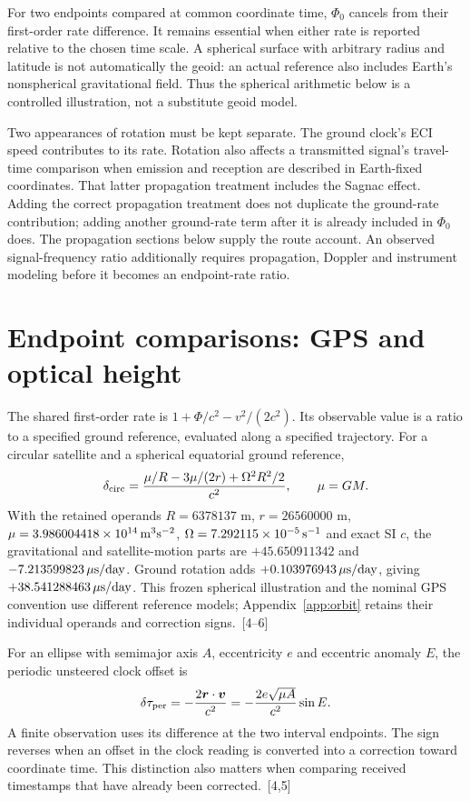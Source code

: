 \documentclass[10pt,twocolumn,letterpaper]{article}
\begin{document}
For two endpoints compared at common coordinate time, $\Phi_0$ cancels from their first-order rate difference. It remains essential when either rate is reported relative to the chosen time scale. A spherical surface with arbitrary radius and latitude is not automatically the geoid: an actual reference also includes Earth's nonspherical gravitational field. Thus the spherical arithmetic below is a controlled illustration, not a substitute geoid model.

Two appearances of rotation must be kept separate. The ground clock's ECI speed contributes to its rate. Rotation also affects a transmitted signal's travel-time comparison when emission and reception are described in Earth-fixed coordinates. That latter propagation treatment includes the Sagnac effect. Adding the correct propagation treatment does not duplicate the ground-rate contribution; adding another ground-rate term after it is already included in $\Phi_0$ does. The propagation sections below supply the route account. An observed signal-frequency ratio additionally requires propagation, Doppler and instrument modeling before it becomes an endpoint-rate ratio.


\section{Endpoint comparisons: GPS and optical height}
The shared first-order rate is $1+\Phi/c^2-v^2/(2c^2)$. Its observable value is a ratio to a specified ground reference, evaluated along a specified trajectory. For a circular satellite and a spherical equatorial ground reference,
\[
 \delta_{\rm circ}=\frac{\mu/R-3\mu/(2r)+\Omega^2R^2/2}{c^2},\qquad \mu=GM.
\]
With the retained operands $R=6378137$ m, $r=26560000$ m, $\mu=3.986004418\times 10^{14}\,{\rm m^3s^{-2}}$, $\Omega=7.292115\times 10^{-5}\,{\rm s^{-1}}$ and exact SI $c$, the gravitational and satellite-motion parts are $+45.650911342$ and $-7.213599823\,\mu{\rm s/day}$. Ground rotation adds $+0.103976943\,\mu{\rm s/day}$, giving $+38.541288463\,\mu{\rm s/day}$. This frozen spherical illustration and the nominal GPS convention use different reference models; Appendix~\ref{app:orbit} retains their individual operands and correction signs.~[4--6]

For an ellipse with semimajor axis $A$, eccentricity $e$ and eccentric anomaly $E$, the periodic unsteered clock offset is
\[
 \delta\tau_{\rm per}=-\frac{2\bm r\cdot\bm v}{c^2}
 =-\frac{2e\sqrt{\mu A}}{c^2}\sin E.
\]
A finite observation uses its difference at the two interval endpoints. The sign reverses when an offset in the clock reading is converted into a correction toward coordinate time. This distinction also matters when comparing received timestamps that have already been corrected.~[4,5]
\end{document}
